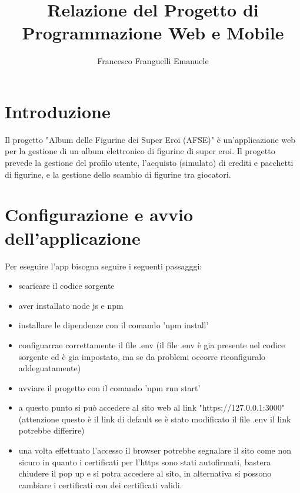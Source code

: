 \documentclass{article}
\title{Relazione del Progetto di Programmazione Web e Mobile}
\author{Francesco Franguelli Emanuele}
\begin{document}
\maketitle

\section*{Introduzione}
Il progetto "Album delle Figurine dei Super Eroi (AFSE)" è un'applicazione web per la gestione di un album elettronico di figurine di super eroi. Il progetto prevede la gestione del profilo utente, l'acquisto (simulato) di crediti e pacchetti di figurine, e la gestione dello scambio di figurine tra giocatori.

\section{Configurazione e avvio dell'applicazione}
    Per eseguire l'app bisogna seguire i seguenti passagggi:
    \begin{itemize}
        \item scaricare il codice sorgente
        \item aver installato node js e npm
        \item installare le dipendenze con il comando 'npm install'
        \item configuarrae correttamente il file .env (il file .env è gia presente nel codice sorgente ed è gia impostato, ma se da problemi occorre riconfiguralo addeguatamente)
        \item avviare il progetto con il comando 'npm run start'
        \item a questo punto si può accedere al sito web al link "https://127.0.0.1:3000" (attenzione questo è il link di default se è stato modificato il file .env il link potrebbe differire)
        \item una volta effettuato l'accesso il browser potrebbe segnalare il sito come non sicuro in quanto i certificati per l'https sono stati autofirmati, bastera chiudere il pop up e si potra accedere al sito, in alternativa si possono cambiare i certificati con dei certificati validi.
    \end{itemize}
\end{document}
